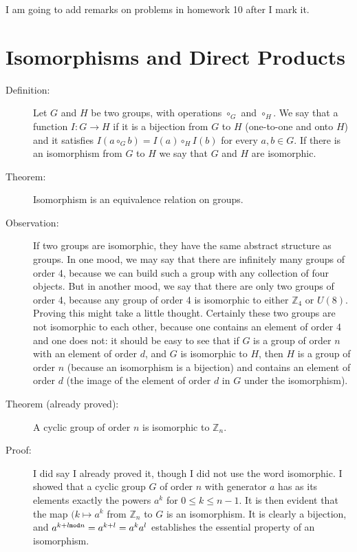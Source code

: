 \documentclass[12pt]{article}
\begin{document}
I am going to add remarks on problems in homework 10 after I mark it.

\section{Isomorphisms and Direct Products}

\begin{description}

\item[Definition:]  Let $G$ and $H$ be two groups, with operations $\circ_G$ and $\circ_H$.  We say that a function $I:G \rightarrow H$ if it is a bijection
from $G$ to $H$ (one-to-one and onto $H$) and it satisfies $I(a \circ_G b) = I(a) \circ_H I(b)$ for every $a,b \in G$.  If there is an isomorphism from $G$ to $H$
we say that $G$ and $H$ are isomorphic.

\item[Theorem:]  Isomorphism is an equivalence relation on groups.

\item[Observation:]  If two groups are isomorphic, they have the same abstract structure as groups.  In one mood, we may say that there are infinitely
many groups of order 4, because we can build such a group with any collection of four objects.  But in another mood, we say that there are only two groups of
order 4, because any group of order 4 is isomorphic to either ${\mathbb Z}_4$ or $U(8)$.  Proving this might take a little thought.  Certainly these two groups are not isomorphic to each other, because one contains an element of order 4
and one does not:  it should be easy to see that if $G$ is a group of order $n$ with an element of order $d$, and $G$ is isomorphic to $H$, then $H$ is a group of order $n$ (because an isomorphism is a bijection) and contains an element of order $d$ (the image of the element of order $d$ 
in $G$ under the isomorphism).

\item[Theorem (already proved):]  A cyclic group of order $n$ is isomorphic to ${\mathbb Z}_n$.

\item[Proof:]  I did say I already proved it, though I did not use the word isomorphic.  I showed that a cyclic group $G$ of order $n$ with generator $a$ has as its elements
exactly the powers $a^k$ for $0 \leq k \leq n-1$.  It is then evident that the map $(k \mapsto a^k$ from ${\mathbb Z}_n$ to $G$ is an isomorphism.  It is clearly a bijection,
and $a^{k+l {\tt mod}n} = a^{k+l} = a^ka^l$ establishes the essential property of an isomorphism.


\end{description}
\end{document}
